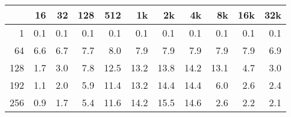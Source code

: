 \begin{tabular}{r | r r r r r r r r r r}
 	 &16	 &32	 &128	 &512	 &1k	 &2k	 &4k	 &8k	 &16k	 &32k	\\ \hline
1	& 0.1	& 0.1	& 0.1	& 0.1	& 0.1	& 0.1	& 0.1	& 0.1	& 0.1	& 0.1	\\
64	& 6.6	& 6.7	& 7.7	& 8.0	& 7.9	& 7.9	& 7.9	& 7.9	& 7.9	& 6.9	\\
128	& 1.7	& 3.0	& 7.8	& 12.5	& 13.2	& 13.8	& 14.2	& 13.1	& 4.7	& 3.0	\\
192	& 1.1	& 2.0	& 5.9	& 11.4	& 13.2	& 14.4	& 14.4	& 6.0	& 2.6	& 2.4	\\
256	& 0.9	& 1.7	& 5.4	& 11.6	& 14.2	& 15.5	& 14.6	& 2.6	& 2.2	& 2.1	\\
\end{tabular}
